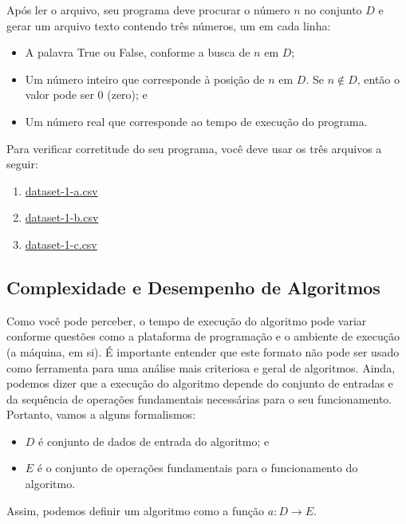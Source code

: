 \documentclass{article}
\begin{document}
Após ler o arquivo, seu programa deve procurar o número \(n\) no
conjunto \(D\) e gerar um arquivo texto contendo três números, um em
cada linha:

\begin{itemize}
\itemsep1pt\parskip0pt
\item
  A palavra True ou False, conforme a busca de \(n\) em \(D\);
\item
  Um número inteiro que corresponde à posição de \(n\) em \(D\). Se
  \(n \not\in D\), então o valor pode ser \(0\) (zero); e
\item
  Um número real que corresponde ao tempo de execução do programa.
\end{itemize}

Para verificar corretitude do seu programa, você deve usar os três
arquivos a seguir:

\begin{enumerate}
\def\labelenumi{\arabic{enumi}.}
\itemsep1pt\parskip0pt
\item
  \url{dataset-1-a.csv}
\item
  \url{dataset-1-b.csv}
\item
  \url{dataset-1-c.csv}
\end{enumerate}


    \subsection{Complexidade e Desempenho de Algoritmos}


    Como você pode perceber, o tempo de execução do algoritmo pode variar
conforme questões como a plataforma de programação e o ambiente de
execução (a máquina, em si). É importante entender que este formato não
pode ser usado como ferramenta para uma análise mais criteriosa e geral
de algoritmos. Ainda, podemos dizer que a execução do algoritmo depende
do conjunto de entradas e da sequência de operações fundamentais
necessárias para o seu funcionamento. Portanto, vamos a alguns
formalismos:

\begin{itemize}
\itemsep1pt\parskip0pt
\item
  \(D\) é conjunto de dados de entrada do algoritmo; e
\item
  \(E\) é o conjunto de operações fundamentais para o funcionamento do
  algoritmo.
\end{itemize}

Assim, podemos definir um algoritmo como a função
\(a : D \rightarrow E\).
\end{document}
